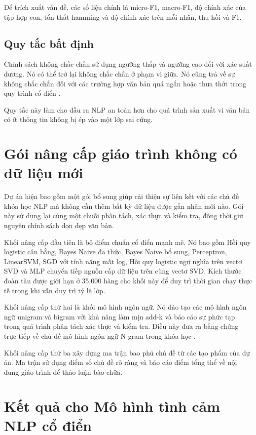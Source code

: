 \documentclass[12pt,a4paper]{article}
\begin{document}
Để trích xuất vấn đề, các số liệu chính là micro-F1, macro-F1, độ chính xác của tập hợp con, tổn thất hamming và độ chính xác trên mỗi nhãn, thu hồi và F1.

\subsection{Quy tắc bất định}
Chính sách không chắc chắn sử dụng ngưỡng thấp và ngưỡng cao đối với xác suất dương. Nó có thể trở lại không chắc chắn ở phạm vi giữa. Nó cũng trả về sự không chắc chắn đối với các trường hợp văn bản quá ngắn hoặc thưa thớt trong quy trình cổ điển \cite{geifman2017}.

Quy tắc này làm cho đầu ra NLP an toàn hơn cho quá trình sản xuất vì văn bản có ít thông tin không bị ép vào một lớp sai cứng.

\section{Gói nâng cấp giáo trình không có dữ liệu mới}
Dự án hiện bao gồm một gói bổ sung giúp cải thiện sự liên kết với các chủ đề khóa học NLP mà không cần thêm bất kỳ dữ liệu được gắn nhãn mới nào. Gói này sử dụng lại cùng một chuỗi phân tách, xác thực và kiểm tra, đồng thời giữ nguyên chính sách dọn dẹp văn bản.

Khối nâng cấp đầu tiên là bộ điểm chuẩn cổ điển mạnh mẽ. Nó bao gồm Hồi quy logistic cân bằng, Bayes Naive đa thức, Bayes Naive bổ sung, Perceptron, LinearSVM, SGD với tính năng mất log, Hồi quy logistic ngữ nghĩa trên vectơ SVD và MLP chuyển tiếp nguồn cấp dữ liệu trên cùng vectơ SVD. Kích thước đoàn tàu được giới hạn ở 35.000 hàng cho khối này để duy trì thời gian chạy thực tế trong khi vẫn duy trì tỷ lệ lớp.

Khối nâng cấp thứ hai là khối mô hình ngôn ngữ. Nó đào tạo các mô hình ngôn ngữ unigram và bigram với khả năng làm mịn add-k và báo cáo sự phức tạp trong quá trình phân tách xác thực và kiểm tra. Điều này đưa ra bằng chứng trực tiếp về chủ đề mô hình ngôn ngữ N-gram trong khóa học \cite{jurafsky2026,manning2008ir}.

Khối nâng cấp thứ ba xây dựng ma trận bao phủ chủ đề từ các tạo phẩm của dự án. Ma trận sử dụng điểm số chủ đề rõ ràng và báo cáo điểm tổng thể về nội dung giáo trình để thảo luận bào chữa.

\section{Kết quả cho Mô hình tình cảm NLP cổ điển}
\end{document}
